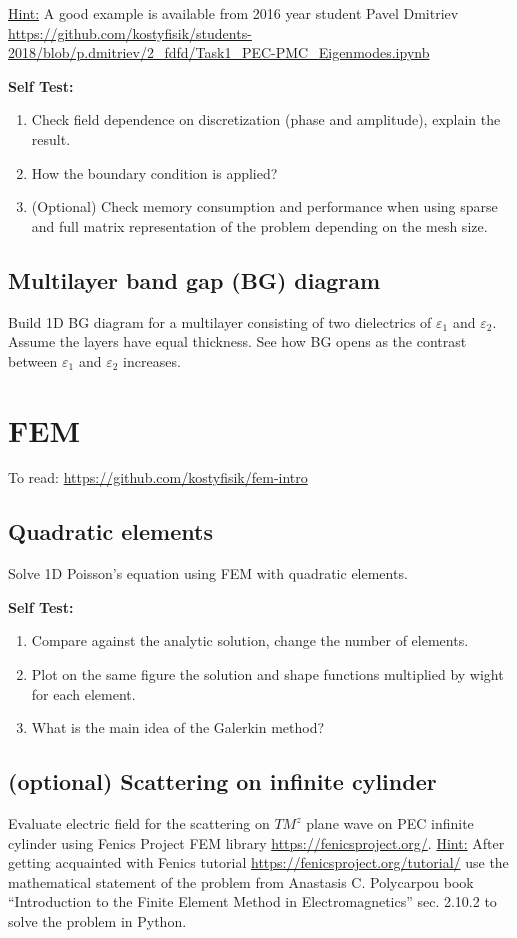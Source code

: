 \documentclass[11pt]{article}
\begin{document}
\underline{Hint:} A good example is available from 2016 year student
Pavel Dmitriev \url{https://github.com/kostyfisik/students-2018/blob/p.dmitriev/2_fdfd/Task1_PEC-PMC_Eigenmodes.ipynb}

\textbf{Self Test:}
\begin{enumerate}
\item Check field dependence on discretization (phase
  and amplitude), explain the result.
\item How the boundary condition is applied?
\item (Optional) Check memory consumption and performance when using sparse and full matrix representation of the problem depending on the mesh size.
\end{enumerate}

\subsection{Multilayer band gap (BG) diagram}
\label{sec:multilayer-band-gap}

Build 1D BG diagram for a multilayer consisting of two dielectrics of
$\varepsilon_1$ and $\varepsilon_2$. Assume the layers have equal
thickness. See how BG opens as the contrast between $\varepsilon_1$ and
$\varepsilon_2$ increases.

\section{FEM}

To read: \url{https://github.com/kostyfisik/fem-intro}

\subsection{Quadratic elements}
\label{sec:quadratic-elements}

Solve 1D Poisson's equation using FEM with quadratic elements.

\textbf{Self Test:}
\begin{enumerate}
\item Compare against the analytic solution, change the number of elements.
\item Plot on the same figure the solution and shape functions multiplied by wight for each element.
\item What is the main idea of the Galerkin method?
\end{enumerate}

\subsection{(optional) Scattering on infinite cylinder}
Evaluate electric field for the scattering on $TM^z$ plane wave on PEC infinite cylinder using Fenics Project FEM library \url{https://fenicsproject.org/}. \underline{Hint:} After getting acquainted with Fenics tutorial \url{https://fenicsproject.org/tutorial/} use the mathematical statement of the problem from  Anastasis C. Polycarpou book ``Introduction to the Finite Element Method in Electromagnetics'' sec. 2.10.2 to solve the problem in Python.
\end{document}
